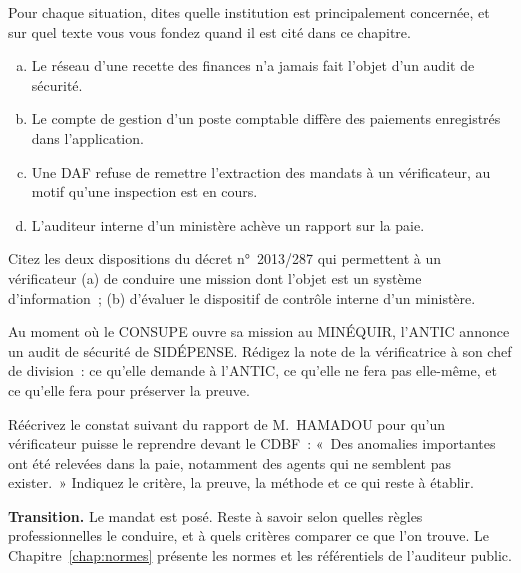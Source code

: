 \begin{boxexo}[title={\ding{45}\quad Exercice~4.1. Qui est compétent~? \niveaubase}]
Pour chaque situation, dites quelle institution est principalement
concernée, et sur quel texte vous vous fondez quand il est cité dans ce
chapitre.
\begin{enumerate}[(a)]
    \item Le réseau d'une recette des finances n'a jamais fait l'objet
          d'un audit de sécurité.
    \item Le compte de gestion d'un poste comptable diffère des paiements
          enregistrés dans l'application.
    \item Une DAF refuse de remettre l'extraction des mandats à un
          vérificateur, au motif qu'une inspection est en cours.
    \item L'auditeur interne d'un ministère achève un rapport sur la paie.
\end{enumerate}
\end{boxexo}

\begin{boxexo}[title={\ding{45}\quad Exercice~4.2. Lire le décret \niveaubase}]
Citez les deux dispositions du décret n°~2013/287 qui permettent à un
vérificateur (a) de conduire une mission dont l'objet est un système
d'information~; (b) d'évaluer le dispositif de contrôle interne d'un
ministère.
\end{boxexo}

\begin{boxexo}[title={\ding{45}\quad Exercice~4.3. Articuler \niveaumoyen}]
Au moment où le CONSUPE ouvre sa mission au MINÉQUIR, l'ANTIC annonce un
audit de sécurité de SIDÉPENSE. Rédigez la note de la vérificatrice à son
chef de division~: ce qu'elle demande à l'ANTIC, ce qu'elle ne fera pas
elle-même, et ce qu'elle fera pour préserver la preuve.
\end{boxexo}

\begin{boxexo}[title={\ding{45}\quad Exercice~4.4. Un rapport reproductible \niveauexpert}]
Réécrivez le constat suivant du rapport de M.~HAMADOU pour qu'un
vérificateur puisse le reprendre devant le CDBF~: «~Des anomalies
importantes ont été relevées dans la paie, notamment des agents qui ne
semblent pas exister.~» Indiquez le critère, la preuve, la méthode et ce
qui reste à établir.
\end{boxexo}

\begin{boxinfo}
\textbf{Transition.} Le mandat est posé. Reste à savoir selon quelles
règles professionnelles le conduire, et à quels critères comparer ce que
l'on trouve. Le Chapitre~\ref{chap:normes} présente les normes et les
référentiels de l'auditeur public.
\end{boxinfo}
